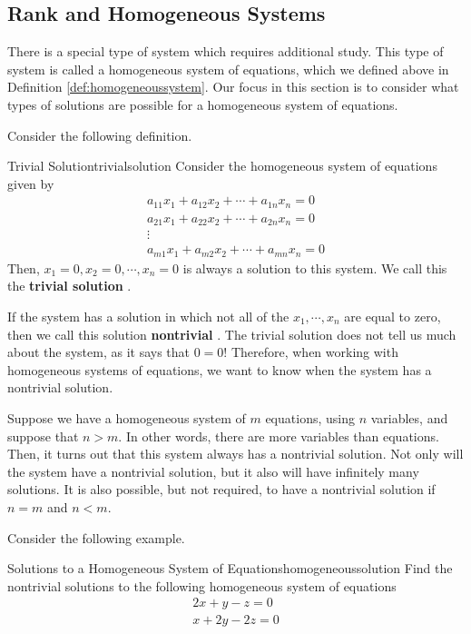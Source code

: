 \subsection{Rank and Homogeneous Systems}

There is a special type of system which requires additional study. This type of system is called a homogeneous system of
equations, which we defined above in Definition \ref{def:homogeneoussystem}. 
Our focus in this section is to consider what types of solutions are possible for a homogeneous system of equations. 

Consider the following definition. 

\begin{definition}{Trivial Solution}{trivialsolution}
Consider the homogeneous system of equations given by
\begin{equation*}
\begin{array}{c}
a_{11}x_{1}+a_{12}x_{2}+\cdots +a_{1n}x_{n}= 0 \\
a_{21}x_{1}+a_{22}x_{2}+\cdots +a_{2n}x_{n}= 0  \\
\vdots \\
a_{m1}x_{1}+a_{m2}x_{2}+\cdots +a_{mn}x_{n}= 0 
\end{array}
\end{equation*}
Then, $x_{1} = 0, x_{2} = 0, \cdots, x_{n} =0$ is always a 
solution to this system. We call this the \textbf{trivial solution} .
\end{definition}

If the system has a solution in which not all of the $x_1, \cdots, x_n$ are equal to zero,
then we call this solution \textbf{nontrivial} . The trivial solution
does not tell us much about the system, as it says that $0=0$! 
Therefore, when working with homogeneous systems of 
equations, we want to know when the system has a nontrivial solution. 

Suppose we have a homogeneous system of $m$ equations, using $n$ variables, and suppose that
$n > m$. In other words, there are more variables than equations. 
Then, it turns out that this system always has a nontrivial solution. Not only will the
system have a nontrivial solution, but it also will have infinitely many solutions.
It is also possible, but not required, to have a nontrivial solution if $n=m$ and $n<m$.

Consider the following example.

\begin{example}{Solutions to a Homogeneous System of Equations}{homogeneoussolution}
Find the nontrivial solutions to the following homogeneous system of equations
\begin{equation*}
\begin{array}{c}
2x + y - z = 0 \\
x + 2y - 2z = 0
\end{array}
\end{equation*}
\end{example}

